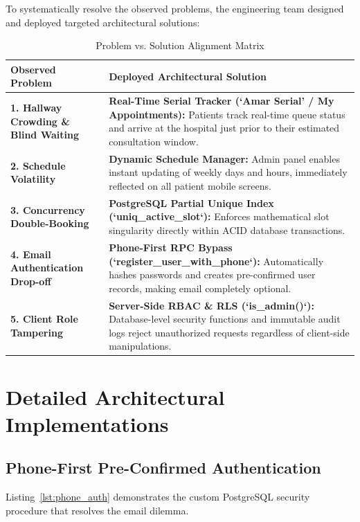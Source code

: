 \documentclass[11pt,a4paper,oneside]{report}
\begin{document}
To systematically resolve the observed problems, the engineering team designed and deployed targeted architectural solutions:

\begin{table}[H]
\centering
\small
\begin{tabularx}{\textwidth}{p{4.5cm}X}
\toprule
\textbf{Observed Problem} & \textbf{Deployed Architectural Solution} \\
\midrule
\textbf{1. Hallway Crowding \& Blind Waiting} & \textbf{Real-Time Serial Tracker (`Amar Serial' / My Appointments):} Patients track real-time queue status and arrive at the hospital just prior to their estimated consultation window. \\
\addlinespace
\textbf{2. Schedule Volatility} & \textbf{Dynamic Schedule Manager:} Admin panel enables instant updating of weekly days and hours, immediately reflected on all patient mobile screens. \\
\addlinespace
\textbf{3. Concurrency Double-Booking} & \textbf{PostgreSQL Partial Unique Index (`uniq\_active\_slot`):} Enforces mathematical slot singularity directly within ACID database transactions. \\
\addlinespace
\textbf{4. Email Authentication Drop-off} & \textbf{Phone-First RPC Bypass (`register\_user\_with\_phone`):} Automatically hashes passwords and creates pre-confirmed user records, making email completely optional. \\
\addlinespace
\textbf{5. Client Role Tampering} & \textbf{Server-Side RBAC \& RLS (`is\_admin()`):} Database-level security functions and immutable audit logs reject unauthorized requests regardless of client-side manipulations. \\
\bottomrule
\end{tabularx}
\caption{Problem vs. Solution Alignment Matrix}
\label{tab:solutions}
\end{table}

\section{Detailed Architectural Implementations}

\subsection{Phone-First Pre-Confirmed Authentication}
Listing~\ref{lst:phone_auth} demonstrates the custom PostgreSQL security procedure that resolves the email dilemma.
\end{document}
